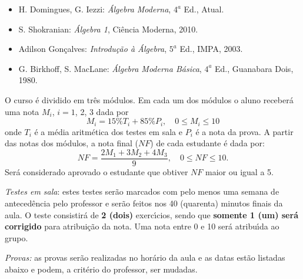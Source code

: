 \documentclass[12pt]{article}
\begin{document}
\vspace{0.5cm}
\begin{itemize}

\item H. Domingues, G. Iezzi: {\it {\'A}lgebra Moderna}, $4^a$
  Ed., Atual.

\item S. Shokranian: {\it {\'A}lgebra 1}, Ci{\^e}ncia Moderna, 2010.

\item Adilson Gon{\c c}alves: {\it Introdu{\c c}{\~a}o {\`a} {\'A}lgebra}, $5^a$ Ed., IMPA,
  2003.

\item G. Birkhoff, S. MacLane: {\it {\'A}lgebra Moderna B{\'a}sica}, $4^a$ Ed.,
  Guanabara Dois, 1980.

\end{itemize}

 O curso \'{e} dividido em tr\^{e}s
m\'{o}dulos.  Em cada um dos m\'odulos o aluno receber\'a uma nota $M_i$, $i = 1$, 2, 3 dada por
\[
    M_i = 15\%T_i + 85\%P_i, \quad 0 \le M_i \le 10
\]
onde $T_i$  \'e a m\'edia aritm\'etica dos testes em sala e $P_i$ \'e a nota da prova. A partir das notas dos m\'odulos, a nota final ($NF$) de cada estudante \'e dada por:
\[
    NF = \dfrac{2M_1 + 3M_2 + 4M_3}{9}, \quad 0 \le NF \le 10.
\]
Ser\'a considerado aprovado o estudante que obtiver $NF$ maior ou igual a 5.

\vspace{0.5cm}
\noindent\textit{Testes em sala}: estes testes ser\~ao marcados com pelo menos uma semana de anteced\^encia pelo professor e ser\~ao feitos nos 40 (quarenta) minutos finais da aula. O teste consistir\'a de \textbf{2 (dois)} exerc{\'\i}cios, sendo que \textbf{somente 1 (um) ser\'a corrigido} para atribui\c{c}\~ao da nota. Uma nota entre 0 e 10 ser\'a atribu{\'\i}da ao grupo.

\vspace{0.5cm}

\noindent\textit{Provas:} as provas ser\~ao realizadas no hor\'ario da aula e as datas est\~ao listadas abaixo e podem, a crit\'erio do professor, ser mudadas.
\end{document}
